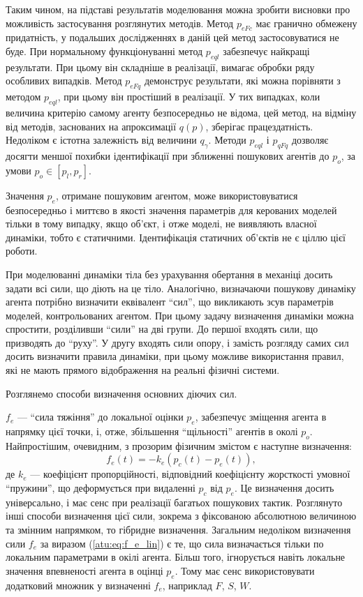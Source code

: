 \documentclass[a4paper,13pt]{atuaref}
\begin{document}
Таким чином, на підставі результатів моделювання можна зробити висновки про
можливість застосування розглянутих методів. Метод $ p_{eFc} $ має гранично
обмежену придатність, у подальших дослідженнях в даній цей метод застосовуватися
не буде. При нормальному функціонуванні метод $ p_{eql} $ забезпечує найкращі
результати. При цьому він складніше в реалізації, вимагає обробки ряду
особливих випадків. Метод $ p_{eFq} $ демонструє результати, які можна
порівняти з методом $ p_{eql} $, при цьому він простіший в реалізації. У тих
випадках, коли величина критерію самому агенту безпосередньо не відома, цей
метод, на відміну від методів, заснованих на апроксимації $ q (p) $, зберігає
працездатність. Недоліком є істотна залежність від величини $ q_\gamma $.
Методи $ p_ {eql} $ і $ p_ {qFq} $ дозволяє досягти меншої похибки
ідентифікації при зближенні пошукових агентів до $ p_o $, за умови $ p_o \in [p_l, p_r] $.



Значення $ p_e $, отримане пошуковим агентом, може використовуватися
безпосередньо і миттєво в якості значення параметрів для керованих моделей
тільки в тому випадку, якщо об'єкт, і отже моделі, не виявляють власної
динаміки, тобто є статичними. Ідентифікація статичних об'єктів не є ціллю
цієї роботи.

При моделюванні динаміки тіла без урахування обертання в механіці досить задати
всі сили, що діють на це тіло. Аналогічно, визначаючи пошукову динаміку агента
потрібно визначити еквівалент ``сил'', що викликають зсув параметрів моделей,
контрольованих агентом. При цьому задачу визначення динаміки можна спростити,
розділивши ``сили'' на дві групи. До першої входять сили, що призводять до ``руху''.
У другу входять сили опору, і замість розгляду самих сил досить
визначити правила динаміки, при цьому можливе використання правил, які не мають
прямого відображення на реальні фізичні системи.

Розглянемо способи визначення основних діючих сил.

$f_e $ --- ``сила тяжіння'' до локальної оцінки $ p_e $, забезпечує зміщення
агента в напрямку цієї точки, і, отже, збільшення ``щільності'' агентів в
околі $p_o$. Найпростішим, очевидним, з прозорим фізичним змістом є
наступне визначення:
%
\begin{equation}
  f_e(t) = - k_e \left( p_c(t) - p_e(t) \right)  ,
  \label{atu:eq:f_e_lin}
\end{equation}
%
де $ k_e $ --- коефіцієнт пропорційності, відповідний коефіцієнту жорсткості
умовної ``пружини'', що деформується при видаленні $ p_c $ від $ p_e $. Це
визначення досить універсально, і має сенс при реалізації багатьох пошукових
тактик. Розглянуто інші способи визначення цієї сили, зокрема з фіксованою
абсолютною величиною та змінним напрямком, то гібридне визначення.
Загальним недоліком визначення сили $ f_e $ за виразом (\ref{atu:eq:f_e_lin})
є те, що сила визначається тільки по локальним параметрами в окілі
агента. Більш того, ігнорується навіть локальне значення впевненості агента в
оцінці $ p_e $. Тому має сенс використовувати додатковий множник у визначенні $f_e$,
наприклад $F$, $S$, $W$.
\end{document}
